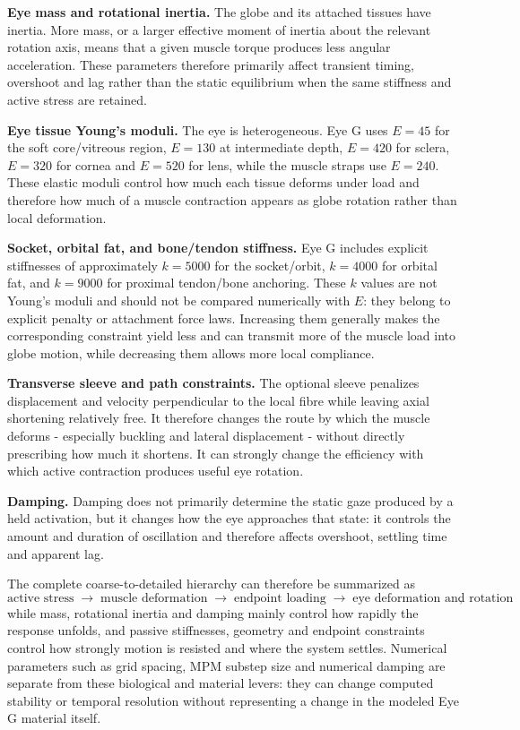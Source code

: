 \documentclass[11pt]{article}
\begin{document}
\textbf{Eye mass and rotational inertia.} The globe and its attached tissues have inertia. More mass, or a larger effective moment of inertia about the relevant rotation axis, means that a given muscle torque produces less angular acceleration. These parameters therefore primarily affect transient timing, overshoot and lag rather than the static equilibrium when the same stiffness and active stress are retained.

\textbf{Eye tissue Young's moduli.} The eye is heterogeneous. Eye G uses $E=45$ for the soft core/vitreous region, $E=130$ at intermediate depth, $E=420$ for sclera, $E=320$ for cornea and $E=520$ for lens, while the muscle straps use $E=240$. These elastic moduli control how much each tissue deforms under load and therefore how much of a muscle contraction appears as globe rotation rather than local deformation.

\textbf{Socket, orbital fat, and bone/tendon stiffness.} Eye G includes explicit stiffnesses of approximately $k=5000$ for the socket/orbit, $k=4000$ for orbital fat, and $k=9000$ for proximal tendon/bone anchoring. These $k$ values are not Young's moduli and should not be compared numerically with $E$: they belong to explicit penalty or attachment force laws. Increasing them generally makes the corresponding constraint yield less and can transmit more of the muscle load into globe motion, while decreasing them allows more local compliance.

\textbf{Transverse sleeve and path constraints.} The optional sleeve penalizes displacement and velocity perpendicular to the local fibre while leaving axial shortening relatively free. It therefore changes the route by which the muscle deforms - especially buckling and lateral displacement - without directly prescribing how much it shortens. It can strongly change the efficiency with which active contraction produces useful eye rotation.

\textbf{Damping.} Damping does not primarily determine the static gaze produced by a held activation, but it changes how the eye approaches that state: it controls the amount and duration of oscillation and therefore affects overshoot, settling time and apparent lag.

The complete coarse-to-detailed hierarchy can therefore be summarized as
\begin{equation}
\boxed{\text{active stress}\;\rightarrow\;\text{muscle deformation}\;\rightarrow\;\text{endpoint loading}\;\rightarrow\;\text{eye deformation and rotation}},
\label{eq:material-levers}
\end{equation}
while mass, rotational inertia and damping mainly control how rapidly the response unfolds, and passive stiffnesses, geometry and endpoint constraints control how strongly motion is resisted and where the system settles. Numerical parameters such as grid spacing, MPM substep size and numerical damping are separate from these biological and material levers: they can change computed stability or temporal resolution without representing a change in the modeled Eye G material itself.
\end{document}

